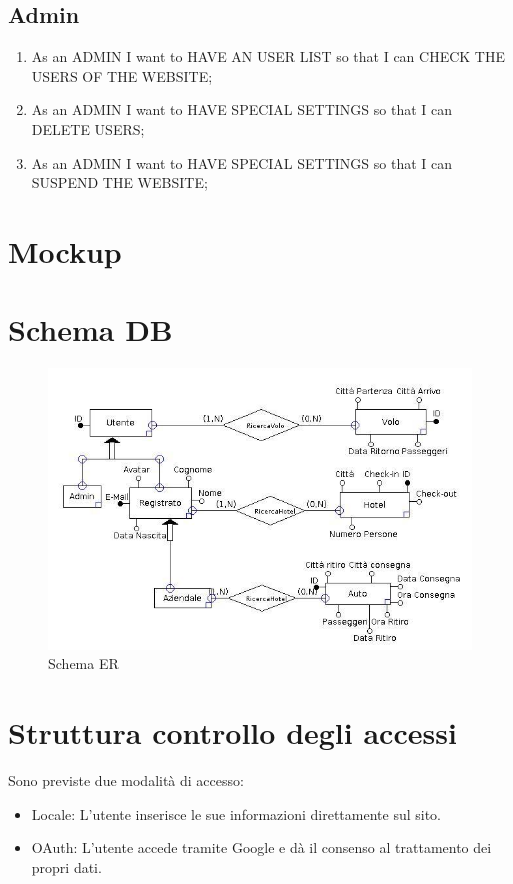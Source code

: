 \documentclass[11pt]{article}
\begin{document}
\subsection{Admin}
\begin{enumerate}
	\item As an ADMIN I want to HAVE AN USER LIST so that I can CHECK THE USERS OF THE WEBSITE;
	\item As an ADMIN I want to HAVE SPECIAL SETTINGS so that I can DELETE USERS;
	\item As an ADMIN I want to HAVE SPECIAL SETTINGS so that I can SUSPEND THE WEBSITE;
\end{enumerate}

\section{Mockup}

\section{Schema DB}
\begin{figure}[!ht]
	\includegraphics[width=1.2\textwidth]{progetto} %
	\caption{Schema ER}
	\label{fig:picture1}
\end{figure}

\section{Struttura controllo degli accessi}
Sono previste due modalità di accesso:
\begin{itemize}
	\item Locale: L’utente inserisce le sue informazioni direttamente sul sito.
	\item OAuth: L’utente accede tramite Google e dà il consenso al trattamento dei propri dati.
\end{itemize}
\end{document}
